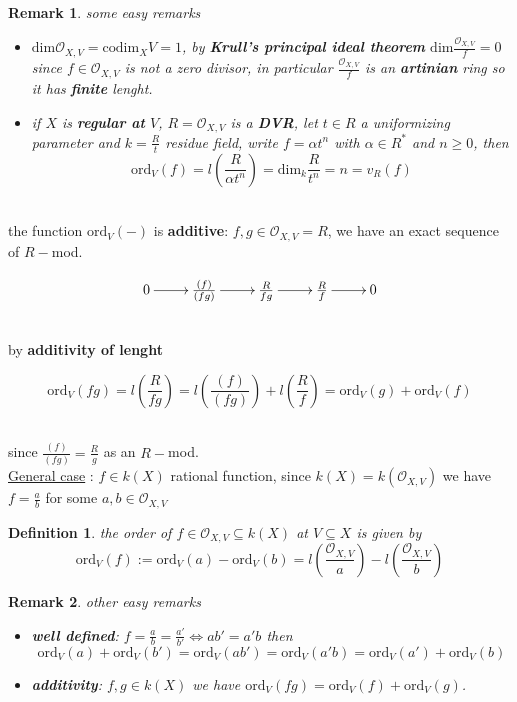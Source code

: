 \documentclass[oneside,a4paper,11pt]{amsbook}
\theoremstyle{pl}
\theoremstyle{df}
\newtheorem*{dfn}{Definition}
\theoremstyle{rm}
\newtheorem{rmk}{Remark}[chapter]
\newcommand{\nline}{
~\\
}%
\newcommand{\pa}[1]{
\left(#1\right)
}
\newcommand{\ul}[1]{
\underline{#1}
}
\newcommand{\mc}[1]{
\mathcal{#1}
}
\newcommand{\dm}{
\text{dim}
}
\newcommand{\ord}[2]{
\text{ord}_{#1}\pa{#2}
}
\newcommand{\cod}[2]{
\text{codim}_{#1}{#2}
}
\begin{document}
\begin{rmk}
some easy remarks
\begin{itemize}
\item{$\dm{\mc{O}_{X,V}}=\cod{X}{V}=1$, by \textbf{Krull's principal ideal theorem} $\dm{\frac{\mc{O}_{X,V}}{f}}=0$ since $f\in\mc{O}_{X,V}$ is not a zero divisor, in particular $\frac{\mc{O}_{X,V}}{f}$ is an \textbf{artinian} ring so it has \textbf{finite} lenght.}
\item{if $X$ is \textbf{regular at} $V$, $R=\mc{O}_{X,V}$ is a \textbf{DVR}, let $t\in R$ a uniformizing parameter and $k=\frac{R}{t}$ residue field, write $f=\alpha t^n$ with $\alpha\in R^*$ and $n\ge 0$, then
\[
\ord{V}{f}=l\pa{\frac{R}{\alpha t^n}}=\dm_k\frac{R}{t^n}=n=v_R(f)
\]
}
\end{itemize}
\end{rmk}

\nline
the function $\ord{V}{-}$ is \textbf{additive}: $f,g\in\mc{O}_{X,V}=R$, we have an exact sequence of $R-$mod.

\[
\xymatrix{
0\ar[r] &\frac{(f)}{(fg)}\ar[r] &\frac{R}{fg}\ar[r] &\frac{R}{f}\ar[r] &0\\
}
\]

\nline
by \textbf{additivity of lenght}

\[
\ord{V}{fg}=l\pa{\frac{R}{fg}}=l\pa{\frac{(f)}{(fg)}}+l\pa{\frac{R}{f}}=\ord{V}{g}+\ord{V}{f}
\]

\nline
since $\frac{(f)}{(fg)}=\frac{R}{g}$ as an $R-$mod.\\
\ul{General case}: $f\in k(X)$ rational function, since $k(X)=k\pa{\mc{O}_{X,V}}$ we have $f=\frac{a}{b}$ for some $a,b\in\mc{O}_{X,V}$

\begin{dfn}
the \emph{order} of $f\in\mc{O}_{X,V}\subseteq k(X)$ \emph{at} $V\subseteq X$ is given by
\[
\ord{V}{f}:=\ord{V}{a}-\ord{V}{b}=l\pa{\frac{\mc{O}_{X,V}}{a}}-l\pa{\frac{\mc{O}_{X,V}}{b}}
\]
\end{dfn} 

\begin{rmk}
other easy remarks
\begin{itemize}
\item{\textbf{well defined}: $f=\frac{a}{b}=\frac{a'}{b'}\Longleftrightarrow ab'=a'b$ then
\[
\ord{V}{a}+\ord{V}{b'}=\ord{V}{ab'}=\ord{V}{a'b}=\ord{V}{a'}+\ord{V}{b}
\]
}
\item{\textbf{additivity}: $f,g\in k(X)$ we have $\ord{V}{fg}=\ord{V}{f}+\ord{V}{g}$.}
\end{itemize}
\end{rmk}
\end{document}
